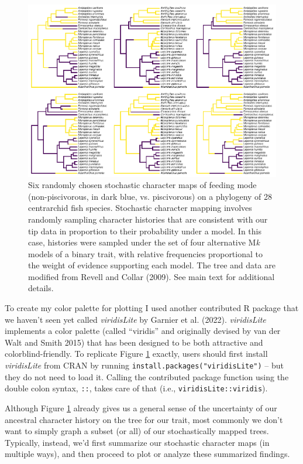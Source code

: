 \documentclass[fleqn,10pt,lineno]{wlpeerj} %
\begin{document}
\begin{figure}
\includegraphics[width=1\linewidth]{Revell.phytools-v2_peerj_files/figure-latex/simmap-trees-1} \caption{Six randomly chosen stochastic character maps of feeding mode (non-piscivorous, in dark blue, vs. piscivorous) on a phylogeny of 28 centrarchid fish species. Stochastic character mapping involves randomly sampling character histories that are consistent with our tip data in proportion to their probability under a model. In this case, histories were sampled under the set of four alternative M\textit{k} models of a binary trait, with relative frequencies proportional to the weight of evidence supporting each model. The tree and data are modified from Revell and Collar (2009). See main text for additional details.}\label{fig:simmap-trees}
\end{figure}

To create my color palette for plotting I used another contributed R package that we haven't seen yet called \emph{viridisLite} by Garnier et al. (2022). \emph{viridisLite} implements a color palette (called ``viridis'' and originally devised by van der Walt and Smith 2015) that has been designed to be both attractive and colorblind-friendly. To replicate Figure \ref{fig:simmap-trees} exactly, users should first install \emph{viridisLite} from CRAN by running \texttt{install.packages("viridisLite")} -- but they do not need to load it. Calling the contributed package function using the double colon syntax, \texttt{::}, takes care of that (i.e., \texttt{viridisLite::viridis}).

Although Figure \ref{fig:simmap-trees} already gives us a general sense of the uncertainty of our ancestral character history on the tree for our trait, most commonly we don't want to simply graph a subset (or all) of our stochastically mapped trees. Typically, instead, we'd first summarize our stochastic character maps (in multiple ways), and then proceed to plot or analyze these summarized findings.
\end{document}
